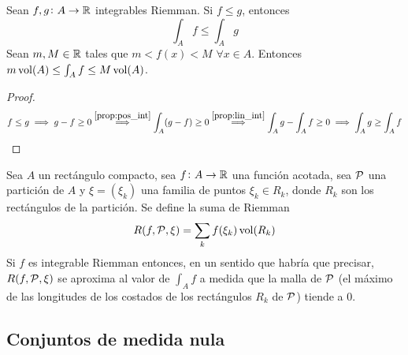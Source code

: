 \begin{col}
	Sean $f,g \colon A \to \mathbb{R}$ integrables Riemman. Si $f \leq g$, entonces
	\[
		\int_A f \leq \int_A g
	\]
	Sean $m,M \in \mathbb{R}$ tales que $m < f(x) < M$ $\forall x \in A$. Entonces
	$m\operatorname{vol}(A) \leq \int_A f \leq M\operatorname{vol}(A)$.
\end{col}

\begin{proof}
	\[
		f \leq g \implies g - f \geq 0 \stackrel{\ref{prop:pos_int}}{\implies}
		\int_A (g-f) \geq 0 \stackrel{\ref{prop:lin_int}}{\implies} \int_A g -
		\int_A f \geq 0 \implies \int_A g \geq \int_A f
	\]
\end{proof}

\begin{prop}
	Sea $A$ un rectángulo compacto, sea $f \colon A \to \mathbb{R}$ una función acotada,
	sea $\mathcal{P}$ una partición de $A$ y $\xi = \left(\xi_k\right)$ una familia de
	puntos $\xi_k \in R_k$, donde $R_k$ son los rectángulos de la partición. Se
	define la suma de Riemman
	\[
		R(f,\mathcal{P},\xi) = \sum_k f(\xi_k)\operatorname{vol}(R_k) 
	\]
	Si $f$ es integrable Riemman entonces, en un sentido que habría que precisar,
	$R(f,\mathcal{P},\xi)$ se aproxima al valor de $\int_A f$ a medida que la malla de
	$\mathcal{P}$ (el máximo de las longitudes de los costados de los rectángulos $R_k$ de
	$\mathcal{P}$) tiende a 0.
\end{prop}

\subsection{Conjuntos de medida nula}

